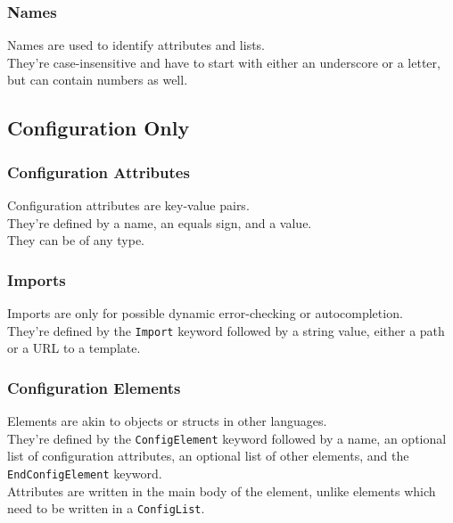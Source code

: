 \documentclass[12pt]{article}
\begin{document}
    \subsubsection{Names}
    Names are used to identify attributes and lists. \\
    They're case-insensitive and have to start with either an underscore or a letter, but can contain numbers as well.

    \newpage

    \subsection{Configuration Only}

    \subsubsection{Configuration Attributes}
    Configuration attributes are key-value pairs. \\
    They're defined by a name, an equals sign, and a value. \\
    They can be of any type.

    \subsubsection{Imports}
    Imports are only for possible dynamic error-checking or autocompletion. \\
    They're defined by the \texttt{Import} keyword followed by a string value, either a path or a URL to a template.

    \subsubsection{Configuration Elements}
    Elements are akin to objects or structs in other languages. \\
    They're defined by the \texttt{ConfigElement} keyword followed by a name, an optional list of configuration attributes, an optional list of other elements, and the \texttt{EndConfigElement} keyword. \\
    Attributes are written in the main body of the element, unlike elements which need to be written in a \texttt{ConfigList}.
\end{document}
